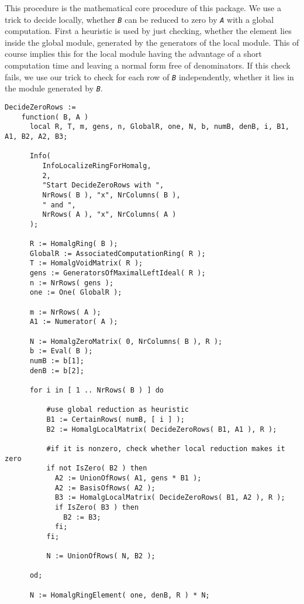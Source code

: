 \documentclass[a4paper,11pt]{report}
\begin{document}
{{{ This procedure is the mathematical core procedure of this package. We use a
trick to decide locally, whether \mbox{\texttt{\slshape B}} can be reduced to zero by \mbox{\texttt{\slshape A}} with a global computation. First a heuristic is used by just checking, whether
the element lies inside the global module, generated by the generators of the
local module. This of course implies this for the local module having the
advantage of a short computation time and leaving a normal form free of
denominators. If this check fails, we use our trick to check for each row of \mbox{\texttt{\slshape B}} independently, whether it lies in the module generated by \mbox{\texttt{\slshape B}}. 
\begin{Verbatim}[fontsize=\small,frame=single,label=Code]
  DecideZeroRows :=
    function( B, A )
      local R, T, m, gens, n, GlobalR, one, N, b, numB, denB, i, B1, A1, B2, A2, B3;
      
      Info( 
         InfoLocalizeRingForHomalg,
         2,
         "Start DecideZeroRows with ",
         NrRows( B ), "x", NrColumns( B ),
         " and ",
         NrRows( A ), "x", NrColumns( A ) 
      );
      
      R := HomalgRing( B );
      GlobalR := AssociatedComputationRing( R );
      T := HomalgVoidMatrix( R );
      gens := GeneratorsOfMaximalLeftIdeal( R );
      n := NrRows( gens );
      one := One( GlobalR );
      
      m := NrRows( A );
      A1 := Numerator( A );
      
      N := HomalgZeroMatrix( 0, NrColumns( B ), R );
      b := Eval( B );
      numB := b[1];
      denB := b[2];
      
      for i in [ 1 .. NrRows( B ) ] do
      
          #use global reduction as heuristic
          B1 := CertainRows( numB, [ i ] );
          B2 := HomalgLocalMatrix( DecideZeroRows( B1, A1 ), R );
          
          #if it is nonzero, check whether local reduction makes it zero
          if not IsZero( B2 ) then
            A2 := UnionOfRows( A1, gens * B1 );
            A2 := BasisOfRows( A2 );
            B3 := HomalgLocalMatrix( DecideZeroRows( B1, A2 ), R );
            if IsZero( B3 ) then
              B2 := B3;
            fi;
          fi;
          
          N := UnionOfRows( N, B2 );
          
      od;
      
      N := HomalgRingElement( one, denB, R ) * N;
      

\end{Verbatim}}}}
\end{document}
